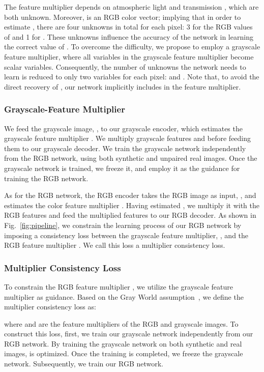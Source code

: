 \documentclass[runningheads]{llncs}
\begin{document}
The feature multiplier  depends on atmospheric light  and transmission , which are both unknown. 
Moreover,  is an RGB color vector; implying that in order to estimate , there are four unknowns in total for each pixel: 3 for the RGB values of  and 1 for . 
These unknowns influence the accuracy of the network in learning the correct value of . 
To overcome the difficulty, we propose to employ a grayscale feature multiplier, where all variables in the grayscale feature multiplier become scalar variables. 
Consequently, the number of unknowns the network needs to learn is reduced to only two variables for each pixel:  and .
Note that, to avoid the direct recovery of , our network implicitly includes  in the feature multiplier.
 
\subsubsection{Grayscale-Feature Multiplier}
We feed the grayscale image, , to our grayscale encoder, which estimates the grayscale feature multiplier . 
We multiply grayscale features and  before feeding them to our grayscale decoder.
We train the grayscale network independently from the RGB network, using both synthetic and unpaired real images.
Once the grayscale network is trained, we freeze it, and employ it as the guidance for training the RGB network.

As for the RGB network, the RGB encoder takes the RGB image as input, , and estimates the color feature multiplier . 
Having estimated , we multiply it with the RGB features and feed the multiplied features to our RGB decoder.
As shown in Fig.~\ref{fig:pipeline}, we constrain the learning process of our RGB network by imposing a consistency loss between the grayscale feature multiplier, , and the RGB feature multiplier .
We call this loss a multiplier consistency loss.

\subsubsection{Multiplier Consistency Loss} 
To constrain the RGB feature multiplier , we utilize the grayscale feature multiplier  as guidance.
Based on the Gray World assumption~\cite{buchsbaum1980spatial},  we define the multiplier consistency loss as:
 
where  and  are the feature multipliers of the RGB and grayscale images.
To construct this loss, first, we train our grayscale network independently from our RGB network.
By training the grayscale network on both synthetic and real images,  is optimized. 
Once the training is completed, we freeze the grayscale network.
Subsequently, we train our RGB network. 
\end{document}
